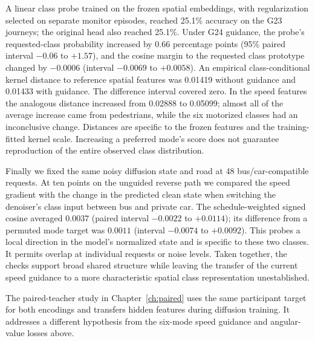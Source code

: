 A linear class probe trained on the frozen spatial embeddings, with regularization selected on separate monitor episodes, reached 25.1\% accuracy on the G23 journeys; the original head also reached 25.1\%. Under G24 guidance, the probe's requested-class probability increased by 0.66 percentage points (95\% paired interval $-0.06$ to $+1.57$), and the cosine margin to the requested class prototype changed by $-0.0006$ (interval $-0.0069$ to $+0.0058$). An empirical class-conditional kernel distance to reference spatial features was 0.01419 without guidance and 0.01433 with guidance. The difference interval covered zero. In the speed features the analogous distance increased from 0.02888 to 0.05099; almost all of the average increase came from pedestrians, while the six motorized classes had an inconclusive change. Distances are specific to the frozen features and the training-fitted kernel scale. Increasing a preferred mode's score does not guarantee reproduction of the entire observed class distribution.

Finally we fixed the same noisy diffusion state and road at 48 bus/car-compatible requests. At ten points on the unguided reverse path we compared the speed gradient with the change in the predicted clean state when switching the denoiser's class input between bus and private car. The schedule-weighted signed cosine averaged $0.0037$ (paired interval $-0.0022$ to $+0.0114$); its difference from a permuted mode target was $0.0011$ (interval $-0.0074$ to $+0.0092$). This probes a local direction in the model's normalized state and is specific to these two classes. It permits overlap at individual requests or noise levels. Taken together, the checks support broad shared structure while leaving the transfer of the current speed guidance to a more characteristic spatial class representation unestablished.

The paired-teacher study in Chapter~\ref{ch:paired} uses the same participant target for both encodings and transfers hidden features during diffusion training. It addresses a different hypothesis from the six-mode speed guidance and angular-value losses above.
